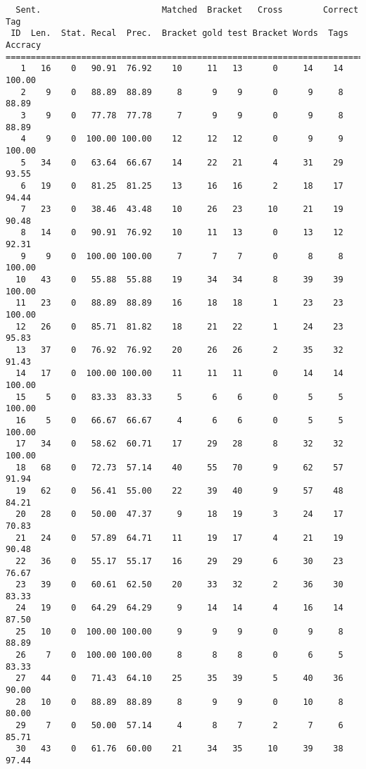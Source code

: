 \scriptsize
\begin{verbatim}
  Sent.                        Matched  Bracket   Cross        Correct Tag
 ID  Len.  Stat. Recal  Prec.  Bracket gold test Bracket Words  Tags Accracy
============================================================================
   1   16    0   90.91  76.92    10     11   13      0     14    14   100.00
   2    9    0   88.89  88.89     8      9    9      0      9     8    88.89
   3    9    0   77.78  77.78     7      9    9      0      9     8    88.89
   4    9    0  100.00 100.00    12     12   12      0      9     9   100.00
   5   34    0   63.64  66.67    14     22   21      4     31    29    93.55
   6   19    0   81.25  81.25    13     16   16      2     18    17    94.44
   7   23    0   38.46  43.48    10     26   23     10     21    19    90.48
   8   14    0   90.91  76.92    10     11   13      0     13    12    92.31
   9    9    0  100.00 100.00     7      7    7      0      8     8   100.00
  10   43    0   55.88  55.88    19     34   34      8     39    39   100.00
  11   23    0   88.89  88.89    16     18   18      1     23    23   100.00
  12   26    0   85.71  81.82    18     21   22      1     24    23    95.83
  13   37    0   76.92  76.92    20     26   26      2     35    32    91.43
  14   17    0  100.00 100.00    11     11   11      0     14    14   100.00
  15    5    0   83.33  83.33     5      6    6      0      5     5   100.00
  16    5    0   66.67  66.67     4      6    6      0      5     5   100.00
  17   34    0   58.62  60.71    17     29   28      8     32    32   100.00
  18   68    0   72.73  57.14    40     55   70      9     62    57    91.94
  19   62    0   56.41  55.00    22     39   40      9     57    48    84.21
  20   28    0   50.00  47.37     9     18   19      3     24    17    70.83
  21   24    0   57.89  64.71    11     19   17      4     21    19    90.48
  22   36    0   55.17  55.17    16     29   29      6     30    23    76.67
  23   39    0   60.61  62.50    20     33   32      2     36    30    83.33
  24   19    0   64.29  64.29     9     14   14      4     16    14    87.50
  25   10    0  100.00 100.00     9      9    9      0      9     8    88.89
  26    7    0  100.00 100.00     8      8    8      0      6     5    83.33
  27   44    0   71.43  64.10    25     35   39      5     40    36    90.00
  28   10    0   88.89  88.89     8      9    9      0     10     8    80.00
  29    7    0   50.00  57.14     4      8    7      2      7     6    85.71
  30   43    0   61.76  60.00    21     34   35     10     39    38    97.44

\end{verbatim}
